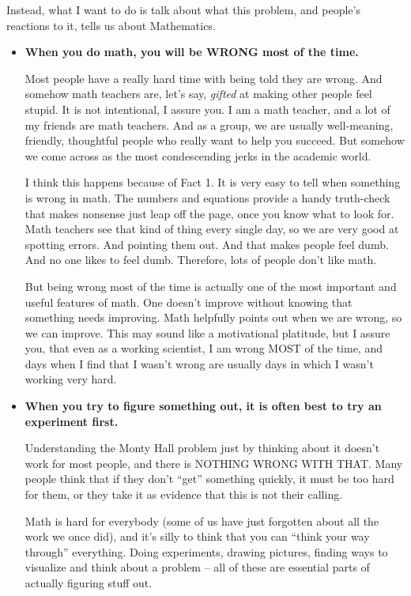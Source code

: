 Instead, what I want to do is talk about what this problem, and
people's reactions to it, tells us about Mathematics.

\begin{itemize}
\item \textbf{When you do math, you will be WRONG most of the time.}

Most people have a really hard time with being told they are wrong.
And somehow math teachers are, let's say, \emph{gifted} at making
other people feel stupid.  It is not intentional, I assure you.  I am
a math teacher, and a lot of my friends are math teachers.  And as a
group, we are usually well-meaning, friendly, thoughtful people who
really want to help you succeed.  But somehow we come across as the
most condescending jerks in the academic world.

I think this happens because of Fact 1.  It is very easy to tell when
something is wrong in math.  The numbers and equations provide a handy
truth-check that makes nonsense just leap off the page, once you know
what to look for.  Math teachers see that kind of thing every single
day, so we are very good at spotting errors.  And pointing them out.
And that makes people feel dumb.  And no one likes to feel dumb.
Therefore, lots of people don't like math.

But being wrong most of the time is actually one of the most important
and useful features of math.  One doesn't improve without knowing that
something needs improving.  Math helpfully points out when we are
wrong, so we can improve.  This may sound like a motivational
platitude, but I assure you, that even as a working scientist, I am
wrong MOST of the time, and days when I find that I wasn't wrong are
usually days in which I wasn't working very hard.

\item \textbf{When you try to figure something out, it is often best
  to try an experiment first.}

Understanding the Monty Hall problem just by thinking about it doesn't
work for most people, and there is NOTHING WRONG WITH THAT.  Many
people think that if they don't ``get'' something quickly, it must be
too hard for them, or they take it as evidence that this is not their
calling.  

Math is hard for everybody (some of us have just forgotten
about all the work we once did), and it's silly to think that you can
``think your way through'' everything.  Doing experiments, drawing
pictures, finding ways to visualize and think about a problem -- all
of these are essential parts of actually figuring stuff out.  


\end{itemize}
